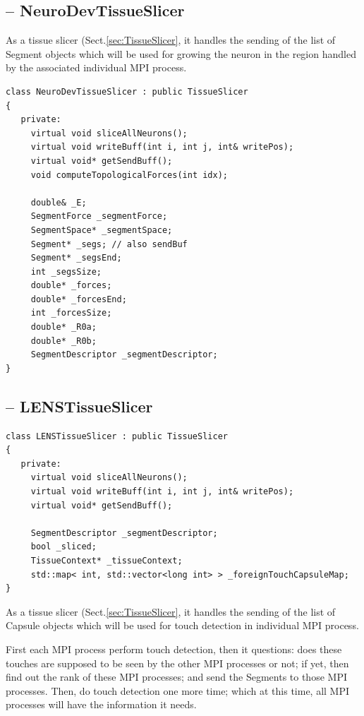 \subsection{-- NeuroDevTissueSlicer}
\label{sec:NeuroDevTissueSlicer}

As a tissue slicer (Sect.\ref{sec:TissueSlicer}, it handles the sending of the
list of Segment objects which will be used for growing the neuron in the
region handled by the associated individual MPI process.

\begin{verbatim}
class NeuroDevTissueSlicer : public TissueSlicer
{
   private:
     virtual void sliceAllNeurons();
     virtual void writeBuff(int i, int j, int& writePos);
     virtual void* getSendBuff();
     void computeTopologicalForces(int idx);

     double& _E;
     SegmentForce _segmentForce;
     SegmentSpace* _segmentSpace;
     Segment* _segs; // also sendBuf
     Segment* _segsEnd;
     int _segsSize;
     double* _forces;
     double* _forcesEnd;
     int _forcesSize;
     double* _R0a;
     double* _R0b;
     SegmentDescriptor _segmentDescriptor;
}
\end{verbatim}


\subsection{-- LENSTissueSlicer}
\label{sec:LENSTissueSlicer}

\begin{verbatim}
class LENSTissueSlicer : public TissueSlicer
{
   private:
     virtual void sliceAllNeurons();
     virtual void writeBuff(int i, int j, int& writePos);
     virtual void* getSendBuff();

     SegmentDescriptor _segmentDescriptor;
     bool _sliced;
     TissueContext* _tissueContext;
     std::map< int, std::vector<long int> > _foreignTouchCapsuleMap;
}
\end{verbatim}

As a tissue slicer (Sect.\ref{sec:TissueSlicer}, it handles the sending of the
list of Capsule objects which will be used for touch detection in individual MPI
process. 

First each MPI process perform touch detection, then it questions: does these
touches are supposed to be seen by the other MPI processes or not; if yet, then
find out the rank of these MPI processes; and send the Segments to those MPI
processes. Then, do touch detection one more time; which at this time, all MPI
processes will have the information it needs.



